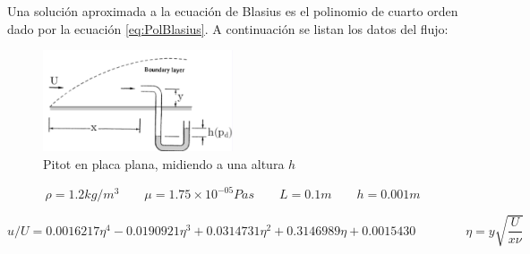 \documentclass[a4paper,10pt]{article}
\begin{document}
\begin{enumerate}
Una solución aproximada a la ecuación de Blasius es el polinomio de cuarto orden dado por la ecuación \ref{eq:PolBlasius}. A continuación se listan los datos del flujo:

\begin{figure}[h!!]
\centering
\includegraphics[width=0.5\textwidth]{capa_limite.png}
\caption{Pitot en placa plana, midiendo a una altura $h$}
\label{fig:capa_limite}
\end{figure}

$$\rho = 1.2 kg/m^3 \qquad \mu =1.75 \times 10^{-05} Pa s \qquad L = 0.1 m \qquad h = 0.001 m$$

\begin{equation}\label{eq:PolBlasius}
u/U = 0.0016217 \eta^4 - 0.0190921 \eta^3 + 0.0314731 \eta^2 + 0.3146989 \eta + 0.0015430 \qquad \qquad \eta = y \sqrt{\frac{U}{x\nu}}
\end{equation}

\clearpage


\end{enumerate}
\end{document}

